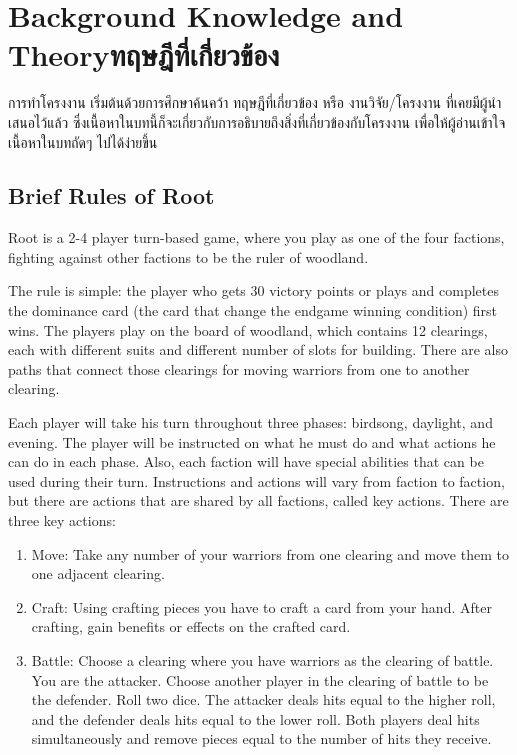 \chapter{\ifenglish Background Knowledge and Theory\else ทฤษฎีที่เกี่ยวข้อง\fi}

การทำโครงงาน เริ่มต้นด้วยการศึกษาค้นคว้า ทฤษฎีที่เกี่ยวข้อง หรือ งานวิจัย/โครงงาน ที่เคยมีผู้นำเสนอไว้แล้ว ซึ่งเนื้อหาในบทนี้ก็จะเกี่ยวกับการอธิบายถึงสิ่งที่เกี่ยวข้องกับโครงงาน เพื่อให้ผู้อ่านเข้าใจเนื้อหาในบทถัดๆ ไปได้ง่ายขึ้น

\section{Brief Rules of Root} \label{brief-rules-of-root}
Root is a 2-4 player turn-based game, where you play as one of the four factions, fighting against other factions to be the ruler of woodland.

The rule is simple: the player who gets 30 victory points or plays and completes the dominance card (the card that change the endgame winning condition) first wins. The players play on the board of woodland, which contains 12 clearings, each with different suits and different number of slots for building. There are also paths that connect those clearings for moving warriors from one to another clearing.

Each player will take his turn throughout three phases: birdsong, daylight, and evening. The player will be instructed on what he must do and what actions he can do in each phase. Also, each faction will have special abilities that can be used during their turn. Instructions and actions will vary from faction to faction, but there are actions that are shared by all factions, called key actions. There are three key actions:

\begin{enumerate}
  \item Move: Take any number of your warriors from one clearing and move them to one adjacent clearing.
  \item Craft: Using crafting pieces you have to craft a card from your hand. After crafting, gain benefits or effects on the crafted card.
  \item Battle: Choose a clearing where you have warriors as the clearing of battle. You are the attacker. Choose another player in the clearing of battle to be the defender. Roll two dice. The attacker deals hits equal to the higher roll, and the defender deals hits equal to the lower roll. Both players deal hits simultaneously and remove pieces equal to the number of hits they receive.
\end{enumerate}

